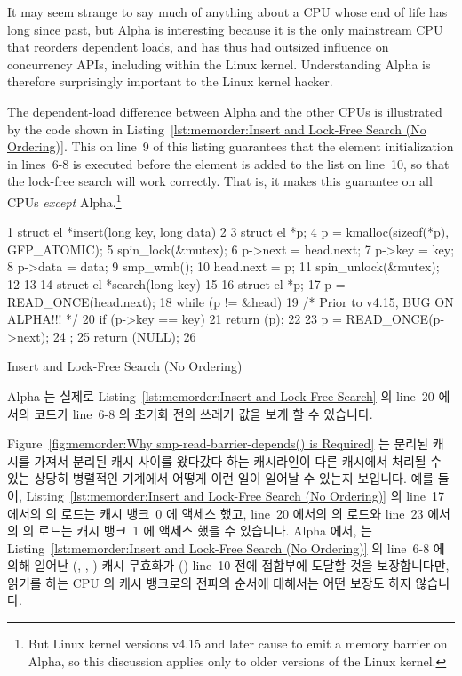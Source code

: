 It may seem strange to say much of anything about a CPU whose end of life
has long since past, but Alpha is interesting because it is the only
mainstream CPU that reorders dependent loads, and has thus had outsized
influence on concurrency APIs, including within the Linux kernel.
Understanding Alpha is therefore surprisingly important to the Linux kernel
hacker.

The dependent-load difference between Alpha and the other CPUs is
illustrated by the code shown in
Listing~\ref{lst:memorder:Insert and Lock-Free Search (No Ordering)}.
This  on line~9 of this listing
guarantees that the element initialization
in lines~6-8 is executed before the element is added to the
list on line~10, so that the lock-free search will work correctly.
That is, it makes this guarantee on all CPUs {\em except} Alpha.\footnote{
	But Linux kernel versions v4.15 and later cause 
	to emit a memory barrier on Alpha, so this discussion applies
	only to older versions of the Linux kernel.}
\fi

\begin{listing}[tbp]
{ \scriptsize
\begin{verbbox}
  1 struct el *insert(long key, long data)
  2 {
  3     struct el *p;
  4     p = kmalloc(sizeof(*p), GFP_ATOMIC);
  5     spin_lock(&mutex);
  6     p->next = head.next;
  7     p->key = key;
  8     p->data = data;
  9     smp_wmb();
 10     head.next = p;
 11     spin_unlock(&mutex);
 12 }
 13
 14 struct el *search(long key)
 15 {
 16     struct el *p;
 17     p = READ_ONCE(head.next);
 18     while (p != &head) {
 19         /* Prior to v4.15, BUG ON ALPHA!!! */
 20         if (p->key == key) {
 21             return (p);
 22         }
 23         p = READ_ONCE(p->next);
 24     };
 25     return (NULL);
 26 }
\end{verbbox}
}
\centering
\theverbbox
\caption{Insert and Lock-Free Search (No Ordering)}
\label{lst:memorder:Insert and Lock-Free Search (No Ordering)}
\end{listing}

Alpha 는 실제로
Listing~\ref{lst:memorder:Insert and Lock-Free Search} 의 line~20 에서의 코드가
line~6-8 의 초기화 전의 쓰레기 값을 보게 할 수 있습니다.

Figure~\ref{fig:memorder:Why smp-read-barrier-depends() is Required}
는 분리된 캐시를 가져서 분리된 캐시 사이를 왔다갔다 하는 캐시라인이 다른
캐시에서 처리될 수 있는 상당히 병렬적인 기계에서 어떻게 이런 일이 일어날 수
있는지 보입니다.
예를 들어,
Listing~\ref{lst:memorder:Insert and Lock-Free Search (No Ordering)}
의 line~17 에서의  의 로드는 캐시 뱅크~0 에 액세스 했고, line~20
에서의  의 로드와 line~23 에서의  의 로드는 캐시 뱅크~1
에 액세스 했을 수 있습니다.
Alpha 에서,  는
Listing~\ref{lst:memorder:Insert and Lock-Free Search (No Ordering)} 의
line~6-8 에 의해 일어난 (, , ) 캐시 무효화가
() line~10 전에 접합부에 도달할 것을 보장합니다만, 읽기를 하는
CPU 의 캐시 뱅크로의 전파의 순서에 대해서는 어떤 보장도 하지 않습니다.
\iffalse

